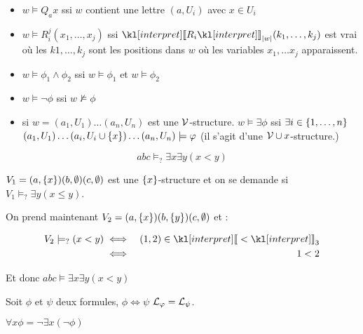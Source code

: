 \begin{itemize}
	\item $w \models Q_a x$ ssi $w$ contient une lettre $(a,U_i)$ avec $x \in U_i$
	\item $w \models R_i^j(x_1, \ldots, x_j)$ ssi $\interpret {R_i}_{\abs w}(k_1, \ldots, k_j)$ est vrai où les $k1, \ldots, k_j$ sont les positions dans $w$ où les variables
	      $x_1, \ldots x_j$ apparaissent.
	\item $w \models \phi_1 \land \phi_2$ ssi $w \models \phi_1$ et $w \models \phi_2$
	\item $w \models \lnot \phi$ ssi $w \nvDash \phi$
	\item si $w = (a_1, U_1) \ldots (a_n, U_n)$ est une $\mathcal{V}$-structure.
	      $w \models \exists \phi$ ssi $\exists i \in \left\{1, \ldots, n\right\}$
	      $(a_1, U_1) \ldots  (a_i, U_i \cup \left\{x\right\})  \ldots (a_n, U_n) \models \varphi$
	      (il s'agit d'une $\mathcal{V} \cup {x}$-structure.)
\end{itemize}

\begin{exemple}
	$$abc \models_? \exists x \exists y (x < y)$$

	$V_1 = (a, \left\{x\right\})(b, \emptyset)(c, \emptyset) $ est une $\left\{x\right\} $-structure et on se demande si
	$V_1 \models_? \exists y (x \leq y)$.

	On prend maintenant $V_2 = (a, \left\{x\right\})(b, \left\{y\right\})(c, \emptyset)$ et :

	\begin{eqnarray*}
		V_2 \models_? (x < y) &\iff& (1,2) \in \interpret {<}_3\\
		&\iff& 1 < 2
	\end{eqnarray*}

	Et donc $abc \models \exists x \exists y (x < y)$
\end{exemple}


Soit $\phi$ et $\psi$ deux formules, $\phi \iff \psi$ \ssi $\mathcal{L}_{\varphi} = \mathcal{L}_{\psi}$.

\begin{abbreviation}
	$\forall x \phi = \neg \exists x (\neg \phi)$
\end{abbreviation}


